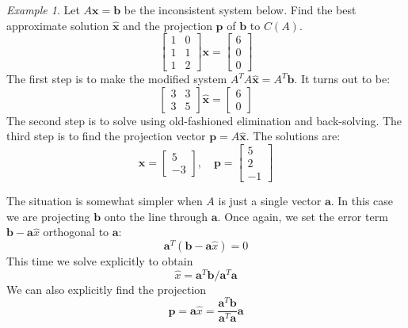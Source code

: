\documentclass[11pt,oneside]{amsbook}
\theoremstyle{definition}
\theoremstyle{plain}
\theoremstyle{definition}
\theoremstyle{remark}
\newtheorem{example}[theorem]{Example}
\numberwithin{equation}{section}
\numberwithin{figure}{section}
\begin{document}
\begin{example}
  Let $A\mathbf{x}=\mathbf{b}$ be the inconsistent system below. Find the best approximate solution $\hat{\mathbf{x}}$ and the projection $\mathbf{p}$ of $\mathbf{b}$ to $C(A)$.
  \[\begin{bmatrix}1&0\\1&1\\1&2\end{bmatrix}\mathbf{x}
    =\begin{bmatrix}6\\0\\0\end{bmatrix}
  \]
  The first step is to make the modified system $A^TA\hat{\mathbf{x}}=A^T\mathbf{b}$. It turns out to be:
  \[\begin{bmatrix}3&3\\3&5\end{bmatrix}\hat{\mathbf{x}}
  =\begin{bmatrix}6\\0\end{bmatrix}
  \]
  The second step is to solve using old-fashioned elimination and back-solving. The third step is to find the projection vector $\mathbf{p}=A\hat{\mathbf{x}}$. The solutions are:
  \[\hat{\mathbf{x}}=\begin{bmatrix}5\\-3\end{bmatrix},\quad 
  \mathbf{p}=\begin{bmatrix}5\\2\\-1\end{bmatrix}
  \]
\end{example}

The situation is somewhat simpler when $A$ is just a single vector $\mathbf{a}$. In this case we are projecting $\mathbf{b}$ onto the line through $\mathbf{a}$. Once again, we set the error term $\mathbf{b}-\mathbf{a}\hat x$ orthogonal to $\mathbf{a}$:
\[\mathbf{a}^T(\mathbf{b}-\mathbf{a}\hat{x})=0
\]
This time we solve explicitly to obtain
\[\hat x=\mathbf{a}^T\mathbf{b}/\mathbf{a}^T\mathbf{a}
\]
We can also explicitly find the projection
\[\mathbf{p}=\mathbf{a}\hat{x}
  =\frac{\mathbf{a}^T\mathbf{b}}{\mathbf{a}^T\mathbf{a}}\mathbf{a}
\]
\end{document}
